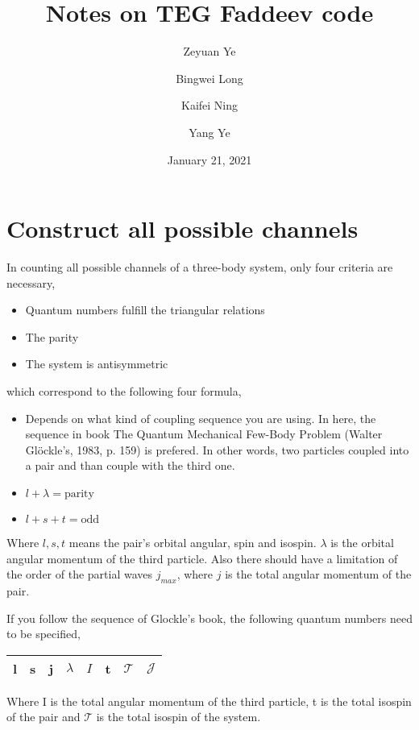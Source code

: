 \documentclass[11pt,aps]{revtex4}
\begin{document}
\date{January 21, 2021}

\title{Notes on TEG Faddeev code}

\author{Zeyuan Ye}
\author{Bingwei Long}
\author{Kaifei Ning}
\author{Yang Ye}

\maketitle

\section{Construct all possible channels}
In counting all possible channels of a three-body system, only four criteria are necessary,

\begin{itemize}
\item{Quantum numbers fulfill the triangular relations}
\item{The parity}
\item{The system is antisymmetric}
\end{itemize}

which correspond to the following four formula,

\begin{itemize}
\item{Depends on what kind of coupling sequence you are using. In here, the
    sequence in book The Quantum Mechanical Few-Body Problem (Walter Gl\"ockle's,
    1983, p. 159) is prefered. In other words, two
    particles coupled into a pair and than couple with the third one.}
\item{$l+\lambda = \text{parity}$}
\item{$l + s + t = \text{odd}$}
\end{itemize}

Where $l, s, t$ means the pair's orbital angular, spin and isospin. $\lambda$ is
the orbital angular momentum of the third particle.
Also there should have a limitation of the order of the partial waves $j_{max}$,
where $j$ is the total angular momentum of the pair.

If you follow the sequence of Glockle's book, the following quantum numbers need
to be specified,
\begin{center}
\begin{tabular}{ | c  c  c c c c c c|}
\hline
l & s & j & $\lambda$ & $I$ & t & $\mathcal{T}$ & $\mathcal{J}$ \\
\hline
\end{tabular}
\end{center}
Where I is the total angular momentum of the third particle, t is the total
isospin of the pair and $\mathcal{T}$ is the total isospin of the system.
\end{document}

